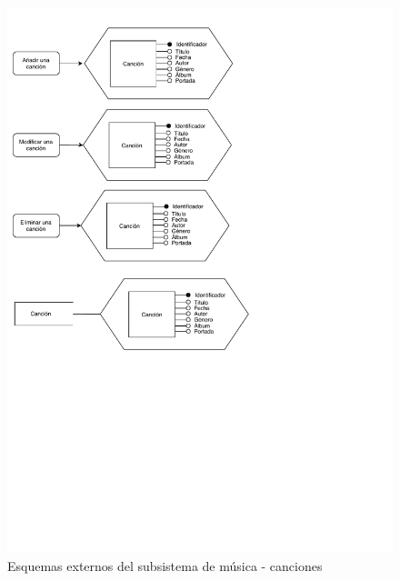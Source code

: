 \begin{figure}[H]
  \caption{Esquemas externos del subsistema de música - canciones}
  \centering
  \includegraphics{diagramas/musica-externo-cancion.pdf}
\end{figure}


